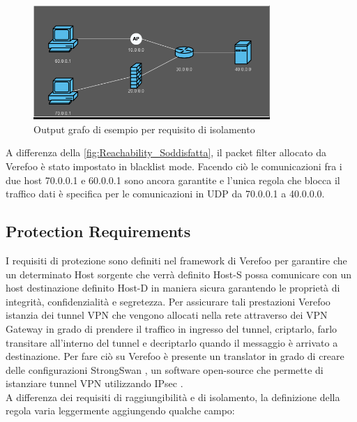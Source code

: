 \begin{figure}[h]  %
    \centering
    \includegraphics[width=0.8\textwidth]{Isolation_Soddisfatta.png}  %
    \caption{Output grafo di esempio per requisito di isolamento}
    \label{fig:Isolation_Soddisfatta}
  \end{figure}

  A differenza della \ref{fig:Reachability_Soddisfatta}, il packet filter allocato da Verefoo è stato impostato in blacklist
  mode. Facendo ciò le comunicazioni fra i due host 70.0.0.1 e 60.0.0.1 sono ancora garantite e l'unica regola che blocca il traffico
  dati è specifica per le comunicazioni in UDP da 70.0.0.1 a 40.0.0.0.
  \newpage


  \subsection{Protection Requirements}
  I requisiti di protezione sono definiti nel framework di Verefoo per garantire che un determinato Host sorgente che verrà definito Host-S possa 
  comunicare con un host destinazione definito Host-D in maniera sicura garantendo le proprietà di integrità, confidenzialità e segretezza.
  Per assicurare tali prestazioni Verefoo istanzia dei tunnel VPN che vengono allocati nella rete attraverso dei  VPN Gateway in grado di prendere il traffico in ingresso
  del tunnel, criptarlo, farlo transitare all'interno del tunnel e decriptarlo quando il messaggio è arrivato a destinazione. Per fare ciò su Verefoo è presente un translator
  in grado di creare delle configurazioni StrongSwan \cite{strongswan}, un software open-source che permette di istanziare tunnel VPN utilizzando IPsec \cite{ipsec}.\\

  A differenza dei requisiti di raggiungibilità e di isolamento, la definizione della regola varia leggermente aggiungendo qualche campo:

